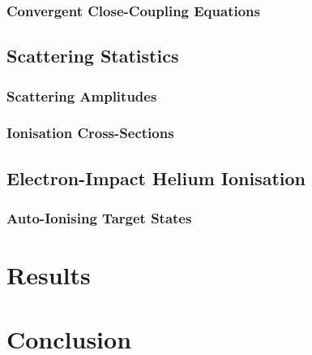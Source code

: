 \documentclass[draft]{article}
\begin{document}
\subsubsection{Convergent Close-Coupling Equations}
\label{sec:ccc-equations}

\subsection{Scattering Statistics}
\label{sec:scat-statistics}

\subsubsection{Scattering Amplitudes}
\label{sec:scat-amplitudes}

\subsubsection{Ionisation Cross-Sections}
\label{sec:ion-cross-sections}

\subsection{Electron-Impact Helium Ionisation}
\label{sec:e-He-ion}

\subsubsection{Auto-Ionising Target States}
\label{sec:auto-ion-states}

\section{Results}
\label{sec:results}

\section{Conclusion}
\label{sec:conclusion}
\end{document}
